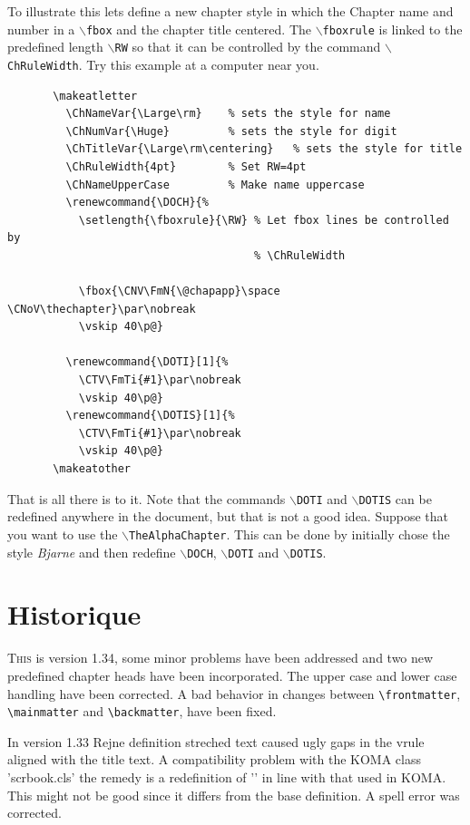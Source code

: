 \documentclass{report}
\newcommand{\A}[1]{{$\backslash${\tt #1}}}
\begin{document}
    To illustrate this lets define a new chapter style in which the
    Chapter name and number in a \A{fbox} and the chapter title
    centered. The \A{fboxrule} is linked to the predefined length
    \A{RW} so that it can be controlled by the command
    \A{ChRuleWidth}. Try this example at a computer near you.
    \begin{verbatim}
       \makeatletter
         \ChNameVar{\Large\rm}    % sets the style for name
         \ChNumVar{\Huge}         % sets the style for digit
         \ChTitleVar{\Large\rm\centering}   % sets the style for title
         \ChRuleWidth{4pt}        % Set RW=4pt
         \ChNameUpperCase         % Make name uppercase
         \renewcommand{\DOCH}{%
           \setlength{\fboxrule}{\RW} % Let fbox lines be controlled by
                                      % \ChRuleWidth

           \fbox{\CNV\FmN{\@chapapp}\space \CNoV\thechapter}\par\nobreak
           \vskip 40\p@}

         \renewcommand{\DOTI}[1]{%
           \CTV\FmTi{#1}\par\nobreak
           \vskip 40\p@}
         \renewcommand{\DOTIS}[1]{%
           \CTV\FmTi{#1}\par\nobreak
           \vskip 40\p@}
       \makeatother
    \end{verbatim}
    That is all there is to it. Note that the commands \A{DOTI} and
    \A{DOTIS} can be redefined anywhere in the document, but that is
    not a good idea. Suppose that you want to use the
    \A{TheAlphaChapter}. This can be done by initially chose the style
    {\em Bjarne}\/ and then redefine \A{DOCH}, \A{DOTI} and \A{DOTIS}.


  \chapter{Historique}

    \lettrine[findent=0.2em,nindent=0em,realheight=true]{T}{his} 
    is version 1.34, some minor problems have been
     addressed and two new predefined chapter heads have been
     incorporated. The upper case and lower case handling have been
     corrected. A bad behavior in changes between \verb+\frontmatter+,
     \verb+\mainmatter+ and  \verb+\backmatter+, have been fixed.   

     In version 1.33 Rejne definition streched text caused ugly gaps
     in the vrule aligned with the title text. A compatibility problem
     with the KOMA class 'scrbook.cls' the remedy is a redefinition of
     '\@schapter' in line with that used in KOMA. This might not be
     good since it differs from the base definition. A spell error was
     corrected.
 
\end{document}
